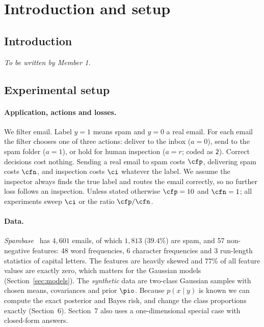 \section{Introduction and setup}

\subsection{Introduction}
\emph{To be written by Member 1.}

\subsection{Experimental setup}

\paragraph{Application, actions and losses.}
We filter email. Label $y=1$ means spam and $y=0$ a real email. For each email the filter
chooses one of three actions: deliver to the inbox ($a=0$), send to the spam folder ($a=1$), or
hold for human inspection ($a=r$; coded as \texttt{2}). Correct decisions cost nothing. Sending
a real email to spam costs $\cfp$, delivering spam costs $\cfn$, and inspection costs $\ci$
whatever the label. We assume the inspector always finds the true label and routes the email
correctly, so no further loss follows an inspection. Unless stated otherwise $\cfp=10$ and $\cfn=1$;
all experiments sweep $\ci$ or the ratio $\cfp/\cfn$.

\paragraph{Data.}
\emph{Spambase}~\cite{spambase} has $4{,}601$ emails, of which $1{,}813$ ($39.4\%$) are spam, and
57 non-negative features: 48 word frequencies, 6 character frequencies and 3 run-length
statistics of capital letters. The features are heavily skewed and $77\%$ of all feature values are
exactly zero, which matters for the Gaussian models (Section~\ref{sec:models}).
The \emph{synthetic} data are two-class Gaussian samples with chosen means, covariances and
prior $\pio$. Because $p(x\mid y)$ is known we can compute the exact posterior and Bayes risk,
and change the class proportions exactly (Section~6). Section~7 also uses a one-dimensional
special case with closed-form answers.

